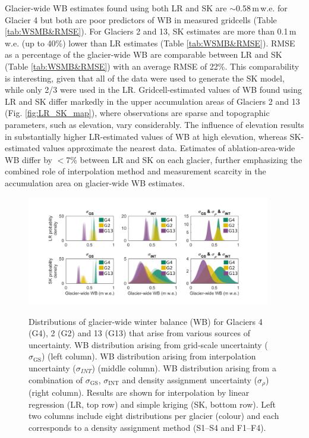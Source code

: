 \documentclass[review,oneside, letterpaper]{igs}
\begin{document}
Glacier-wide WB estimates found using both LR and SK are $\sim$0.58\,m\,w.e. for Glacier 4 but both are poor predictors of  WB in measured gridcells (Table \ref{tab:WSMB&RMSE}). For Glaciers 2 and 13, SK estimates are more than 0.1\,m\,w.e. (up to 40\%) lower than LR estimates (Table \ref{tab:WSMB&RMSE}). RMSE as a percentage of the glacier-wide WB are comparable between LR and SK (Table \ref{tab:WSMB&RMSE}) with an average RMSE of 22\%. This comparability is interesting, given that all of the data were used to generate the SK model, while only 2/3 were used in the LR. Gridcell-estimated values of WB found using LR and SK differ markedly in the upper accumulation areas of Glaciers 2 and 13 (Fig. \ref{fig:LR_SK_map}), where observations are sparse and topographic parameters, such as elevation, vary considerably. The influence of elevation results in substantially higher LR-estimated values of WB at high elevation, whereas SK-estimated values approximate the nearest data. Estimates of ablation-area-wide WB differ by $<$7\% between LR and SK on each glacier, further emphasizing the combined role of interpolation method and measurement scarcity in the accumulation area on glacier-wide WB estimates.

\begin{figure}
	\centering
	\includegraphics[width =0.95\textwidth]{WSMBDist.pdf}\\
	\caption{Distributions of glacier-wide winter balance (WB) for Glaciers 4 (G4), 2 (G2) and 13 (G13) that arise from various sources of uncertainty. WB distribution arising from grid-scale uncertainty ($\sigma_{\mathrm{GS}}$) (left column). WB distribution arising from interpolation uncertainty ($\sigma_{INT}$) (middle column). WB distribution arising from a combination of $\sigma_{\mathrm{GS}}$, $\sigma_{\mathrm{INT}}$ and density assignment uncertainty ($\sigma_{\rho}$) (right column). Results are shown for interpolation by linear regression (LR, top row) and simple kriging (SK, bottom row). Left two columns include eight distributions per glacier (colour) and each corresponds to a density assignment method (S1--S4 and F1--F4).}
	\label{fig:WSMBDist_LR}
\end{figure}
\end{document}
